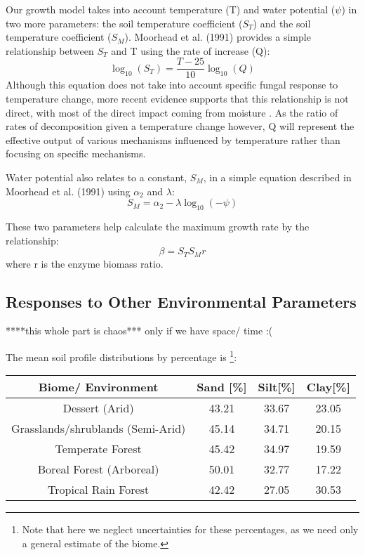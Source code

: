 \documentclass{article}
\begin{document}
Our growth model takes into account temperature (T) and water potential ($\psi$) in two more parameters: the soil temperature coefficient ($S_T$) and the soil temperature coefficient ($S_M$). Moorhead et al. (1991) provides a simple relationship between $S_T$ and T using the rate of increase (Q):
\begin{equation}
\log_{10}(S_T) = \frac{T-25}{10}\log_{10}(Q)
\end{equation}
Although this equation does not take into account specific fungal response to temperature change, more recent evidence supports that this relationship is not direct, with most of the direct impact coming from moisture \cite{Petraglia2018}. As the ratio of rates of decomposition given a temperature change however, Q will represent the effective output of various mechanisms influenced by temperature rather than focusing on specific mechanisms.

Water potential also relates to a constant, $S_M$, in a simple equation described in Moorhead et al. (1991) using $\alpha_2$ and $\lambda$:
\begin{equation}
S_M = \alpha_2 -\lambda \log_{10}(-\psi)
\end{equation}

These two parameters help calculate the maximum growth rate by the relationship:
\begin{equation}
\beta = S_T S_M r
\end{equation}
where r is the enzyme biomass ratio.


\subsection{Responses to Other Environmental Parameters}
****this whole part is chaos*** only if we have space/ time :(

The mean soil profile distributions by percentage is \cite{Zhao2019} \footnote{Note that here we neglect uncertainties for these percentages, as we need only a general estimate of the biome.}: 
\begin{center}
 \begin{tabular}{|c c c c|} 
 \hline
 Biome/ Environment & Sand [\%] & Silt[\%] & Clay[\%] \\ [0.5ex] 
 \hline\hline
 Dessert (Arid) & 43.21 & 33.67 & 23.05 \\ 
 \hline
 Grasslands/shrublands (Semi-Arid) & 45.14 & 34.71 & 20.15 \\
 \hline
 Temperate Forest & 45.42 & 34.97 & 19.59 \\
 \hline
 Boreal Forest (Arboreal) & 50.01 & 32.77 & 17.22 \\
 \hline
 Tropical Rain Forest & 42.42 & 27.05 & 30.53 \\ [1ex] 
 \hline
\end{tabular}
\end{center}
\end{document}

